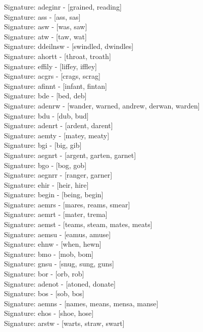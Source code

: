 Signature: {adeginr} - [grained, reading] \\
Signature: {ass} - [ass, sas] \\
Signature: {asw} - [was, saw] \\
Signature: {atw} - [taw, wat] \\
Signature: {ddeilnsw} - [swindled, dwindles] \\
Signature: {ahortt} - [throat, troath] \\
Signature: {effily} - [liffey, iffley] \\
Signature: {acgrs} - [crags, scrag] \\
Signature: {afinnt} - [infant, fintan] \\
Signature: {bde} - [bed, deb] \\
Signature: {adenrw} - [wander, warned, andrew, derwan, warden] \\
Signature: {bdu} - [dub, bud] \\
Signature: {adenrt} - [ardent, darent] \\
Signature: {aemty} - [matey, meaty] \\
Signature: {bgi} - [big, gib] \\
Signature: {aegnrt} - [argent, garten, garnet] \\
Signature: {bgo} - [bog, gob] \\
Signature: {aegnrr} - [ranger, garner] \\
Signature: {ehir} - [heir, hire] \\
Signature: {begin} - [being, begin] \\
Signature: {aemrs} - [mares, reams, smear] \\
Signature: {aemrt} - [mater, trema] \\
Signature: {aemst} - [teams, steam, mates, meats] \\
Signature: {aemsu} - [eamus, amuse] \\
Signature: {ehnw} - [when, hewn] \\
Signature: {bmo} - [mob, bom] \\
Signature: {gnsu} - [snug, sung, guns] \\
Signature: {bor} - [orb, rob] \\
Signature: {adenot} - [atoned, donate] \\
Signature: {bos} - [sob, bos] \\
Signature: {aemns} - [names, means, mensa, manse] \\
Signature: {ehos} - [shoe, hose] \\
Signature: {arstw} - [warts, straw, swart] \\
